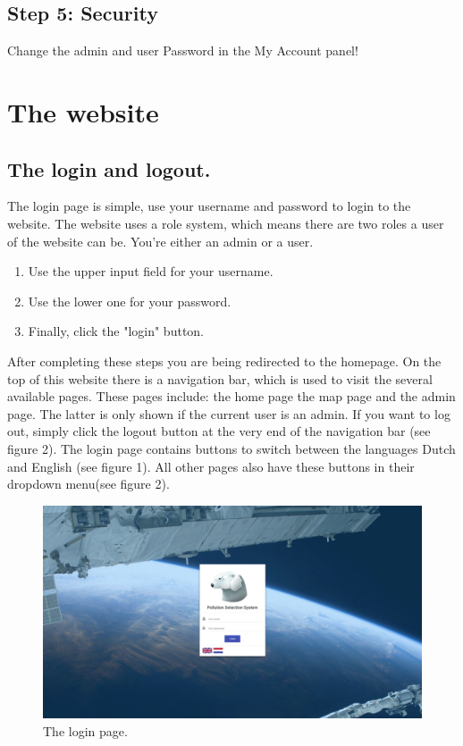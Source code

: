 \documentclass[a4paper]{article}
\begin{document}
\subsection{Step 5: Security}
Change the admin and user Password in the My Account panel!


\newpage
\section{The website}
\subsection{The login and logout.}
The login page is simple, use your username and password to login to the website. The website uses a role system, which means there are two roles a user of the website can be. You're either an admin or a user. 

\begin{enumerate}[]
	\item Use the upper input field for your username.
	\item Use the lower one for your password.
	\item Finally, click the "login" button.
\end{enumerate}
\noindent
After completing these steps you are being redirected to the homepage.
\newline
\newline
On the top of this website there is a navigation bar, which is used to visit the several available pages. These pages include: the home page the map page and the admin page. The latter is only shown if the current user is an admin.
\newline
\newline
If you want to log out, simply click the logout button at the very end of the navigation bar (see figure 2).
\newline
\newline
The login page contains buttons to switch between the languages Dutch and English (see figure 1).
\newline
All other pages also have these buttons in their dropdown menu(see figure 2).
\newline


\begin{figure}[h!]
  \caption{The login page.}
  \centering
  \includegraphics[width=1\textwidth]{login}
\end{figure}
\end{document}
